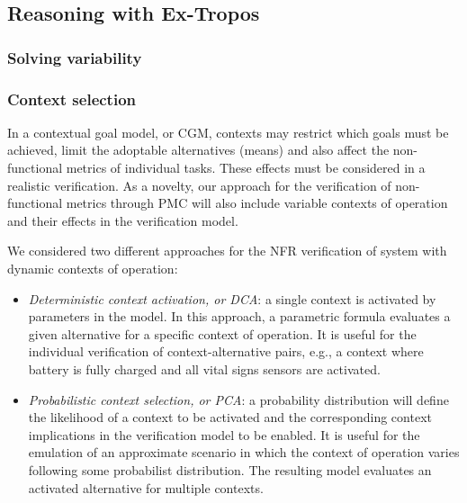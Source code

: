 
\subsection{Reasoning with Ex-Tropos}




\subsubsection{Solving variability}



\subsubsection{Context selection}

In a contextual goal model, or CGM, contexts may restrict which goals must be achieved, limit the adoptable alternatives (means) and also affect the non-functional metrics of individual tasks. These effects must be considered in a realistic verification. As a novelty, our approach for the verification of non-functional metrics through PMC will also include variable contexts of operation and their effects in the verification model. 

We considered two different approaches for the NFR verification of system with dynamic contexts of operation:

\begin{itemize}

\item \textit{Deterministic context activation, or DCA}: a single context is activated by parameters in the model. In this approach, a parametric formula evaluates a given alternative for a specific context of operation. It is useful for the individual verification of context-alternative pairs, e.g., a context where battery is fully charged and all vital signs sensors are activated.
\medskip

\item \textit{Probabilistic context selection, or PCA}: a probability distribution will define the likelihood of a context to be activated and the corresponding context implications in the verification model to be enabled. It is useful for the emulation of an approximate scenario in which the context of operation varies following some probabilist distribution. The resulting model evaluates an activated alternative for multiple contexts. 

\end{itemize}

